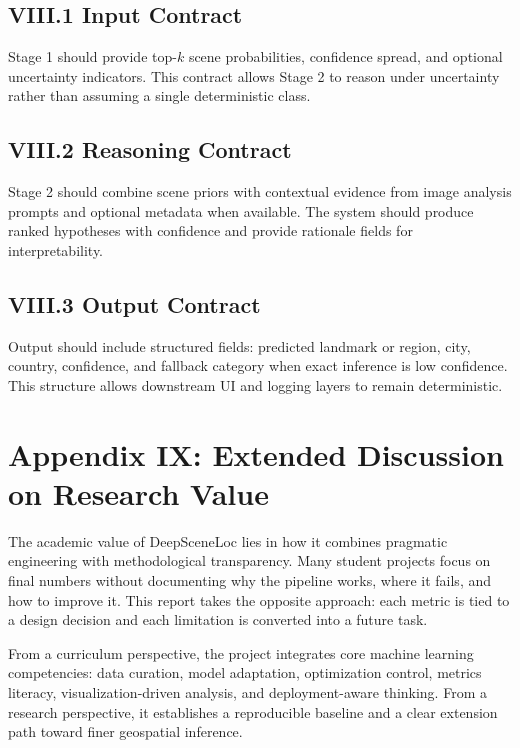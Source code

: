 \subsection*{VIII.1 Input Contract}
Stage 1 should provide top-$k$ scene probabilities, confidence spread, and optional uncertainty indicators. This contract allows Stage 2 to reason under uncertainty rather than assuming a single deterministic class.

\subsection*{VIII.2 Reasoning Contract}
Stage 2 should combine scene priors with contextual evidence from image analysis prompts and optional metadata when available. The system should produce ranked hypotheses with confidence and provide rationale fields for interpretability.

\subsection*{VIII.3 Output Contract}
Output should include structured fields: predicted landmark or region, city, country, confidence, and fallback category when exact inference is low confidence. This structure allows downstream UI and logging layers to remain deterministic.

\section*{Appendix IX: Extended Discussion on Research Value}

The academic value of DeepSceneLoc lies in how it combines pragmatic engineering with methodological transparency. Many student projects focus on final numbers without documenting why the pipeline works, where it fails, and how to improve it. This report takes the opposite approach: each metric is tied to a design decision and each limitation is converted into a future task.

From a curriculum perspective, the project integrates core machine learning competencies: data curation, model adaptation, optimization control, metrics literacy, visualization-driven analysis, and deployment-aware thinking. From a research perspective, it establishes a reproducible baseline and a clear extension path toward finer geospatial inference.

